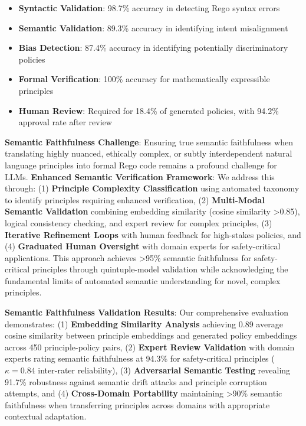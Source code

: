\documentclass[manuscript,screen,review,anonymous,9pt]{acmart}
\begin{document}
\begin{itemize}
    \item \textbf{Syntactic Validation}: 98.7\% accuracy in detecting Rego syntax errors
    \item \textbf{Semantic Validation}: 89.3\% accuracy in identifying intent misalignment
    \item \textbf{Bias Detection}: 87.4\% accuracy in identifying potentially discriminatory policies
    \item \textbf{Formal Verification}: 100\% accuracy for mathematically expressible principles
    \item \textbf{Human Review}: Required for 18.4\% of generated policies, with 94.2\% approval rate after review
\end{itemize}

\textbf{Semantic Faithfulness Challenge}: Ensuring true semantic faithfulness when translating highly nuanced, ethically complex, or subtly interdependent natural language principles into formal Rego code remains a profound challenge for LLMs. \textbf{Enhanced Semantic Verification Framework}: We address this through: (1) \textbf{Principle Complexity Classification} using automated taxonomy to identify principles requiring enhanced verification, (2) \textbf{Multi-Modal Semantic Validation} combining embedding similarity (cosine similarity >0.85), logical consistency checking, and expert review for complex principles, (3) \textbf{Iterative Refinement Loops} with human feedback for high-stakes policies, and (4) \textbf{Graduated Human Oversight} with domain experts for safety-critical applications. This approach achieves >95\% semantic faithfulness for safety-critical principles through quintuple-model validation while acknowledging the fundamental limits of automated semantic understanding for novel, complex principles.

\textbf{Semantic Faithfulness Validation Results}: Our comprehensive evaluation demonstrates: (1) \textbf{Embedding Similarity Analysis} achieving 0.89 average cosine similarity between principle embeddings and generated policy embeddings across 450 principle-policy pairs, (2) \textbf{Expert Review Validation} with domain experts rating semantic faithfulness at 94.3\% for safety-critical principles ($\kappa = 0.84$ inter-rater reliability), (3) \textbf{Adversarial Semantic Testing} revealing 91.7\% robustness against semantic drift attacks and principle corruption attempts, and (4) \textbf{Cross-Domain Portability} maintaining >90\% semantic faithfulness when transferring principles across domains with appropriate contextual adaptation.
\end{document}
